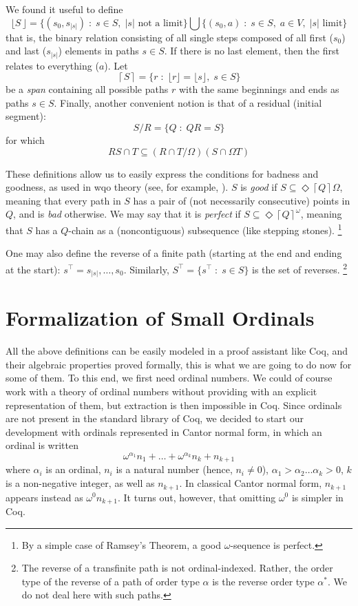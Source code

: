 \documentclass{llncs}
\newcommand{\Span}[1]{\left\lceil#1\right\rceil}
\newcommand{\ABC}{V}
\newcommand{\Bang}[1]{\mathop!#1}
\begin{document}
We found it useful to define
\[
\lfloor S\,\rfloor =\big\{(s_0, s_{|s|}) \;\colon\; s\in S,\;|s| \mbox{ not a limit}\big\} \bigcup \big\{(s_0, a) \;\colon\; s\in S,\; a\in\ABC,\;|s|\mbox{ limit}\big\} 
\]
that is, the binary relation
consisting of all single steps composed of all first ($s_0$) and last ($s_{|s|}$) elements 
in paths $s\in S$.
If there is no last element, then the first relates to everything ($a$).
Let
\[
\Span S = \{r \;\colon\; \lfloor r\rfloor=\lfloor s\rfloor,\; s\in S\}
\]
be a \emph{span}
containing all possible paths $r$ with the same beginnings and ends
as paths $s\in S$.
Finally, another convenient notion is that of a residual (initial segment):
\[
S/R = \{Q \;\colon\; QR=S\} 
\]
for which
\[
R S  \cap T \subseteq (R\cap T /\Omega)(S\cap\Omega T)
\]

These definitions allow us to easily express the conditions for badness and goodness, as used in wqo  theory (see, for example, \cite[Chap.\ 12]{Graph}).
$S$ is \emph{good} if $S \subseteq \Diamond \Span Q \Omega$, 
meaning that every path in $S$ has a pair of (not necessarily consecutive) points in $Q$,
and is \emph{bad} otherwise.
We may say that it is 
\emph{perfect} if $S \subseteq \Diamond {\Span Q}^\omega$,
meaning that $S$ has a $Q$-chain as a (noncontiguous) subsequence (like stepping stones).%
\footnote{By a simple case of Ramsey's Theorem, a good $\omega$-sequence is perfect.}

One may also define
the reverse of a finite path (starting at the end and ending at the start):
$s^\intercal = s_{|s|},\dots,s_0$.
Similarly,
$S^\intercal =\{s^\intercal \;\colon\; s\in S\}$ is the set of reverses.%
\footnote{The reverse of a transfinite path is not ordinal-indexed.
Rather, the order type of the reverse of a path of order type $\alpha$ is the
reverse order type $\alpha^\ast$.
We do not deal here with such paths.}
 
\section{Formalization of Small Ordinals}
 
All the above definitions can be easily modeled in a proof assistant
like Coq, and their algebraic properties proved formally, this is what
we are going to do now for some of them. To this end, we first need
ordinal numbers. We could of course work with a theory of ordinal
numbers without providing with an explicit representation of them, but
extraction is then impossible in Coq. Since ordinals are not present
in the standard library of Coq, we decided to start our development
with ordinals represented in Cantor normal form, in which an ordinal
is written
\[\omega^{\alpha_1}n_1 + \ldots + \omega^{\alpha_k}n_k + n_{k+1}\]
where $\alpha_i$ is an ordinal, $n_i$ is a natural number (hence,
$n_i\neq 0$), $\alpha_1 > \alpha_2\ldots \alpha_k > 0$, $k$ is a
non-negative integer, as well as $n_{k+1}$. In classical Cantor normal
form, $n_{k+1}$ appears instead as $\omega^{0}n_{k+1}$. It turns out, however,
that omitting $\omega^0$ is simpler in Coq.
\end{document}
